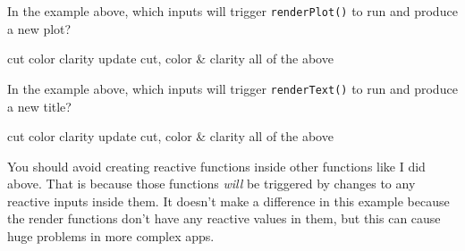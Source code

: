 \documentclass[
  oneside]{book}
\newenvironment{Shaded}{\begin{snugshade}}{\end{snugshade}}
\newcommand{\AttributeTok}[1]{\textcolor[rgb]{0.77,0.63,0.00}{#1}}
\newcommand{\ControlFlowTok}[1]{\textcolor[rgb]{0.13,0.29,0.53}{\textbf{#1}}}
\newcommand{\FloatTok}[1]{\textcolor[rgb]{0.00,0.00,0.81}{#1}}
\newcommand{\FunctionTok}[1]{\textcolor[rgb]{0.00,0.00,0.00}{#1}}
\newcommand{\NormalTok}[1]{#1}
\newcommand{\OtherTok}[1]{\textcolor[rgb]{0.56,0.35,0.01}{#1}}
\newcommand{\SpecialCharTok}[1]{\textcolor[rgb]{0.00,0.00,0.00}{#1}}
\newcommand{\StringTok}[1]{\textcolor[rgb]{0.31,0.60,0.02}{#1}}
\begin{document}
\begin{Shaded}
\end{Shaded}

In the example above, which inputs will trigger \texttt{renderPlot}\texttt{()} to run and produce a new plot?

cut color clarity update cut, color \& clarity all of the above

In the example above, which inputs will trigger \texttt{renderText}\texttt{()} to run and produce a new title?

cut color clarity update cut, color \& clarity all of the above

\begin{warning}
You should avoid creating reactive functions inside other functions like I did above. That is because those functions \emph{will} be triggered by changes to any reactive inputs inside them. It doesn't make a difference in this example because the render functions don't have any reactive values in them, but this can cause huge problems in more complex apps.

\end{warning}
\end{document}
